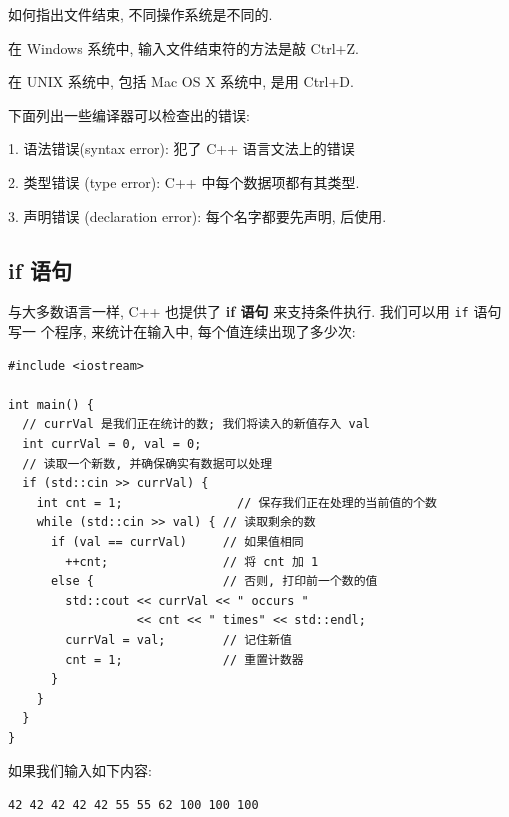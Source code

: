 \documentclass[lang=cn]{elegantbook}
\begin{document}
\vspace*{1\baselineskip}
\begin{note}[从键盘输入文件结束符]

如何指出文件结束, 不同操作系统是不同的.

在 Windows 系统中, 输入文件结束符的方法是敲 Ctrl+Z.

在 UNIX 系统中, 包括 Mac OS X 系统中, 是用 Ctrl+D.
\end{note}


\vspace*{1\baselineskip}
\begin{note}[常见错误]

下面列出一些编译器可以检查出的错误:

1. 语法错误(syntax error): 犯了 C++ 语言文法上的错误

2. 类型错误 (type error): C++ 中每个数据项都有其类型.

3. 声明错误 (declaration error): 每个名字都要先声明, 后使用.
\end{note}

\subsection{if 语句}
\label{sec:org4122186}

与大多数语言一样, C++ 也提供了 \textbf{if 语句} 来支持条件执行. 我们可以用 \texttt{if} 语句写一
个程序, 来统计在输入中, 每个值连续出现了多少次:

\begin{verbatim}
#include <iostream>

int main() {
  // currVal 是我们正在统计的数; 我们将读入的新值存入 val
  int currVal = 0, val = 0;
  // 读取一个新数, 并确保确实有数据可以处理
  if (std::cin >> currVal) {
    int cnt = 1;                // 保存我们正在处理的当前值的个数
    while (std::cin >> val) { // 读取剩余的数
      if (val == currVal)     // 如果值相同
        ++cnt;                // 将 cnt 加 1
      else {                  // 否则, 打印前一个数的值
        std::cout << currVal << " occurs "
                  << cnt << " times" << std::endl;
        currVal = val;        // 记住新值
        cnt = 1;              // 重置计数器
      }
    }
  }
}
\end{verbatim}

如果我们输入如下内容:

\begin{verbatim}
42 42 42 42 42 55 55 62 100 100 100
\end{verbatim}
\end{document}
